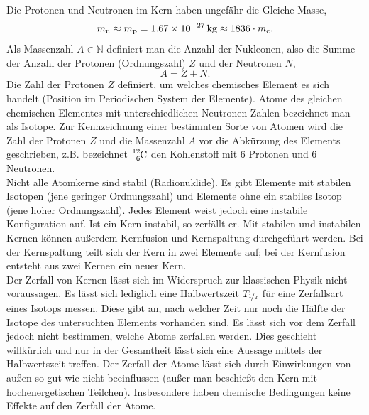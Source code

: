 Die Protonen und Neutronen im Kern haben ungefähr die Gleiche Masse,
\begin{equation}
m_\textrm n \approx m_\textrm p = \SI{1,67E-27}{kg} \approx 1836 \cdot m_\textrm e.
\end{equation}
Als Massenzahl $A \in \mathbb{N}$ definiert man die Anzahl der Nukleonen, also die Summe der Anzahl der Protonen (Ordnungszahl) $Z$ und der Neutronen $N$,
\begin{equation}
A = Z + N.
\end{equation}
Die Zahl der Protonen $Z$ definiert, um welches chemisches Element es sich handelt (Position im Periodischen System der Elemente). Atome des gleichen chemischen Elementes mit unterschiedlichen Neutronen-Zahlen bezeichnet man als Isotope. Zur Kennzeichnung einer bestimmten Sorte von Atomen wird die Zahl der Protonen $Z$ und die Massenzahl $A$ vor die Abkürzung des Elements geschrieben, z.B. bezeichnet $\ce{_6^{12} C}$ den Kohlenstoff mit $6$ Protonen und $6$ Neutronen.\\
Nicht alle Atomkerne sind stabil (Radionuklide). Es gibt Elemente mit stabilen Isotopen (jene geringer Ordnungszahl) und Elemente ohne ein stabiles Isotop (jene hoher Ordnungszahl). Jedes Element weist jedoch eine instabile Konfiguration auf. Ist ein Kern instabil, so zerfällt er. Mit stabilen und instabilen Kernen können außerdem Kernfusion und Kernspaltung durchgeführt werden. Bei der Kernspaltung teilt sich der Kern in zwei Elemente auf; bei der Kernfusion entsteht aus zwei Kernen ein neuer Kern.\\
Der Zerfall von Kernen lässt sich im Widerspruch zur klassischen Physik nicht voraussagen. Es lässt sich lediglich eine Halbwertszeit $T_{\nicefrac{1}{2}}$ für eine Zerfallsart eines Isotops messen. Diese gibt an, nach welcher Zeit nur noch die Hälfte der Isotope des untersuchten Elements vorhanden sind. Es lässt sich vor dem Zerfall jedoch nicht bestimmen, welche Atome zerfallen werden. Dies geschieht willkürlich und nur in der Gesamtheit lässt sich eine Aussage mittels der Halbwertszeit treffen. Der Zerfall der Atome lässt sich durch Einwirkungen von außen so gut wie nicht beeinflussen (außer man beschießt den Kern mit hochenergetischen Teilchen). Insbesondere haben chemische Bedingungen keine Effekte auf den Zerfall der Atome.\\

